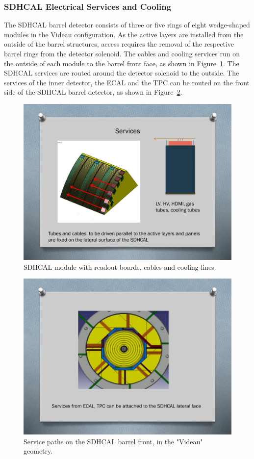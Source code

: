 \subsubsection{SDHCAL Electrical Services and Cooling}
The SDHCAL barrel detector consists of three or five rings of eight wedge-shaped modules in the Videau configuration. As the active layers are installed from the outside of the barrel structures, access requires the removal of the respective barrel rings from the detector solenoid. The cables and cooling services run on the outside of each module to the barrel front face, as shown in Figure~\ref{ILD:fig:sdcal_module_services}. The SDHCAL services are routed around the detector solenoid to the outside. The services of the inner detector, the ECAL and the TPC can be routed on the front side of the SDHCAL barrel detector, as shown in Figure~\ref{ILD:fig:sdhcal_barrel_services}.
\begin{figure}[h!]
    \centering
        \includegraphics[width=0.8\hsize]{Integration/fig/SDHCAL_Module_Services.pdf}
    \caption{SDHCAL module with readout boards, cables and cooling lines.}
    \label{ILD:fig:sdcal_module_services}
\end{figure}
\begin{figure}[h!]
    \centering
        \includegraphics[width=0.6\hsize]{Integration/fig/SDHCAL_Barrel_Services.pdf}
    \caption{Service paths on the SDHCAL barrel front, in the "Videau" geometry.}
    \label{ILD:fig:sdhcal_barrel_services}
\end{figure}

